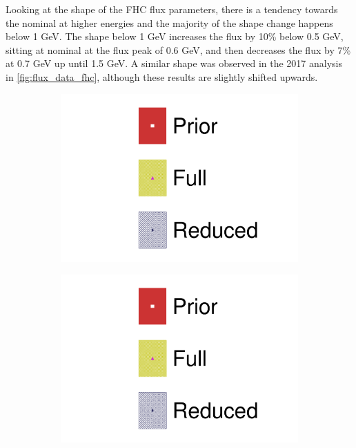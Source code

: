 Looking at the shape of the FHC flux parameters, there is a tendency towards the nominal at higher energies and the majority of the shape change happens below 1 GeV. The shape below 1 GeV increases the flux by 10\% below 0.5 GeV, sitting at nominal at the flux peak of 0.6 GeV, and then decreases the flux by 7\% at 0.7 GeV up until 1.5 GeV. A similar shape was observed in the 2017 analysis in \autoref{fig:flux_data_fhc}, although these results are slightly shifted upwards.
\begin{figure}[h]
	\centering
	\begin{subfigure}[t]{0.1\textwidth}
		\includegraphics[width=\textwidth,page=1, trim={0mm 130mm 40mm 0mm}, clip]{figures/mach3/2018/data/2018a_FixedCov_FullCov_Mpi_Data_merg_2018a_FixedCov_RedCov_Mpi_Data_merge}
	\end{subfigure}
\begin{subfigure}[t]{0.1\textwidth}
\includegraphics[width=\textwidth,page=1, trim={0mm 65mm 40mm 70mm}, clip]{figures/mach3/2018/data/2018a_FixedCov_FullCov_Mpi_Data_merg_2018a_FixedCov_RedCov_Mpi_Data_merge}

\end{subfigure}
\end{figure}
